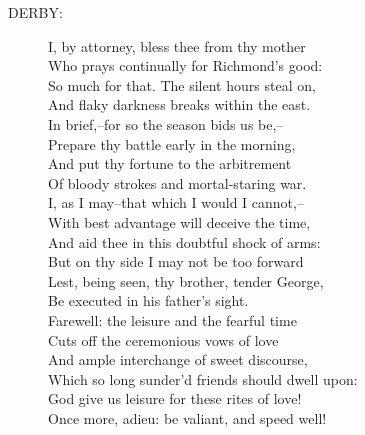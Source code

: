 \documentclass{article}
\begin{document}
\begin{description}
\item[DERBY:] 
\hspace{1pt}I, by attorney, bless thee from thy mother\\
\hspace{1pt}Who prays continually for Richmond's good:\\
\hspace{1pt}So much for that. The silent hours steal on,\\
\hspace{1pt}And flaky darkness breaks within the east.\\
\hspace{1pt}In brief,--for so the season bids us be,--\\
\hspace{1pt}Prepare thy battle early in the morning,\\
\hspace{1pt}And put thy fortune to the arbitrement\\
\hspace{1pt}Of bloody strokes and mortal-staring war.\\
\hspace{1pt}I, as I may--that which I would I cannot,--\\
\hspace{1pt}With best advantage will deceive the time,\\
\hspace{1pt}And aid thee in this doubtful shock of arms:\\
\hspace{1pt}But on thy side I may not be too forward\\
\hspace{1pt}Lest, being seen, thy brother, tender George,\\
\hspace{1pt}Be executed in his father's sight.\\
\hspace{1pt}Farewell: the leisure and the fearful time\\
\hspace{1pt}Cuts off the ceremonious vows of love\\
\hspace{1pt}And ample interchange of sweet discourse,\\
\hspace{1pt}Which so long sunder'd friends should dwell upon:\\
\hspace{1pt}God give us leisure for these rites of love!\\
\hspace{1pt}Once more, adieu: be valiant, and speed well!\\
\end{description}
\end{document}
